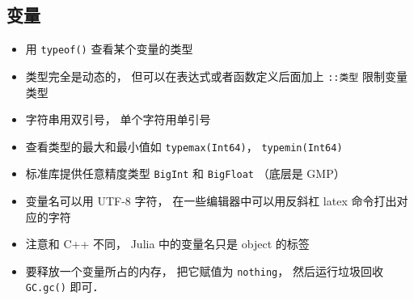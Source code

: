 \subsection{变量}
\begin{itemize}
\item 用 \verb|typeof()| 查看某个变量的类型
\item 类型完全是动态的， 但可以在表达式或者函数定义后面加上 \verb|::类型| 限制变量类型
\item 字符串用双引号， 单个字符用单引号
\item 查看类型的最大和最小值如 \verb|typemax(Int64)|， \verb|typemin(Int64)|
\item 标准库提供任意精度类型 \verb|BigInt| 和 \verb|BigFloat| （底层是 GMP）
\item 变量名可以用 UTF-8 字符， 在一些编辑器中可以用反斜杠 latex 命令打出对应的字符
\item 注意和 C++ 不同， Julia 中的变量名只是 object 的标签
\item 要释放一个变量所占的内存， 把它赋值为 \verb|nothing|， 然后运行垃圾回收 \verb|GC.gc()| 即可．
\end{itemize}

